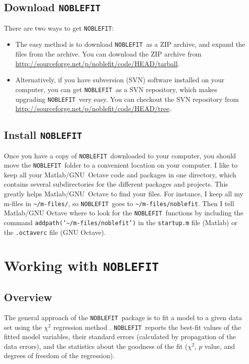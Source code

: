 \documentclass[12pt]{article}
\newcommand{\noblefit}{{\tt NOBLEFIT}}
\newcommand{\secref}[1]{Sec.~\ref{sec:#1}}
\begin{document}
\subsection{Download \noblefit}\label{sec:get_mpic}
There are two ways to get \noblefit: 
\begin{itemize}
	\item The easy method is to download \noblefit\ as a ZIP archive, and expand the files from the archive. You can download the ZIP archive from \url{http://sourceforge.net/p/noblefit/code/HEAD/tarball}.
	\item Alternatively, if you have subversion (SVN) software installed on your computer, you can get \noblefit\ as a SVN repository, which makes upgrading \noblefit\ very easy. You can checkout the SVN repository from \url{http://sourceforge.net/p/noblefit/code/HEAD/tree}.
\end{itemize}

\subsection{Install \noblefit}\label{sec:install_mpic}
Once you have a copy of \noblefit\ downloaded to your computer, you should move the \noblefit\ folder to a convenient location on your computer. I like to keep all your Matlab/\mbox{GNU Octave} code and packages in one directory, which contains several subdirectories for the different packages and projects. This greatly helps Matlab/\mbox{GNU Octave} to find your files. For instance, I keep all my m-files in {\tt \textasciitilde{}/m-files/}, so \noblefit\ goes to {\tt \textasciitilde{}/m-files/noblefit}. Then I tell Matlab/GNU Octave where to look for the \noblefit\ functions by including the command {\tt addpath('\textasciitilde{}/m-files/noblefit')} in the {\tt startup.m} file (Matlab) or the {\tt .octaverc} file (GNU Octave).

\section{Working with \noblefit}

\subsection{Overview}
The general approach of the \noblefit\ package is to fit a model to a given data set using the $\chi^2$ regression method \citep{Press:1986}. \noblefit\ reports the best-fit values of the fitted model variables, their standard errors (calculated by propagation of the data errors), and the statistics about the goodness of the fit ($\chi^2$, $p$ value, and degrees of freedom of the regression).\par
\end{document}
